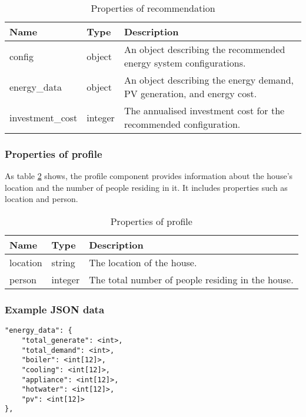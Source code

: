 \begin{table}[h!]
    \centering
    \scriptsize
    \begin{tabular}{ | p{} | p{} | p{} | } 
    \hline
    Name & Type & Description \\
    \hline
    config & object & An object describing the recommended energy system configurations. \\
    \hline
    energy\_data & object & An object describing the energy demand, PV generation, and energy cost. \\
    \hline
    investment\_cost & integer & The annualised investment cost for the recommended configuration. \\
    \hline
    \end{tabular}
    \caption{Properties of recommendation}
    \label{tab:properties_recommendation}
\end{table}


\subsubsection{Properties of profile}

As table \ref{tab:properties_profile} shows, the profile component provides information about the house's location and the number of people residing in it. 
It includes properties such as location and person.

\begin{table}[h!]
    \centering
    \scriptsize
    \begin{tabular}{ | p{} | p{} | p{} | } 
    \hline
    Name & Type & Description \\
    \hline
    location & string & The location of the house. \\
    \hline
    person & integer & The total number of people residing in the house. \\
    \hline
    \end{tabular}
    \caption{Properties of profile}
    \label{tab:properties_profile}
\end{table}


\subsubsection{Example JSON data}

\begin{verbatim}
"energy_data": {
    "total_generate": <int>,
    "total_demand": <int>,
    "boiler": <int[12]>,
    "cooling": <int[12]>,
    "appliance": <int[12]>,
    "hotwater": <int[12]>,
    "pv": <int[12]>
},
\end{verbatim}

